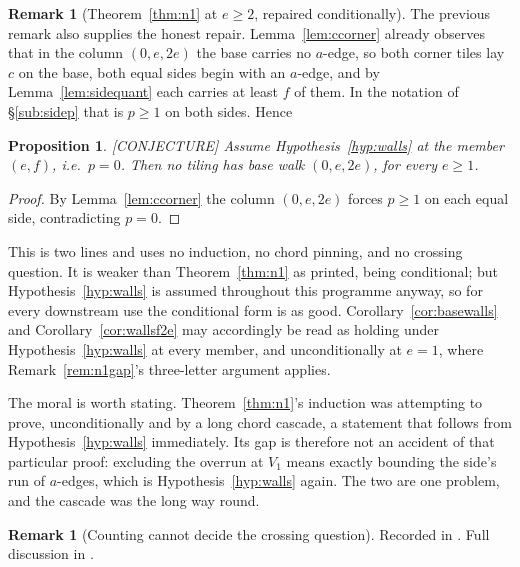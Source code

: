 \documentclass[11pt,reqno]{amsart}
\theoremstyle{plain}
\newtheorem{proposition}[theorem]{Proposition}
\theoremstyle{definition}
\newtheorem{remark}[theorem]{Remark}
\newcommand{\lab}[1]{\hfill\textnormal{\footnotesize\textsc{[#1]}}}
\begin{document}
\begin{remark}[Theorem~\ref{thm:n1} at $e\ge2$, repaired conditionally]\label{rem:n1conditional}
The previous remark also supplies the honest repair. Lemma~\ref{lem:ccorner} already observes that in
the column $(0,e,2e)$ the base carries no $a$-edge, so both corner tiles lay $c$ on the base, both
equal sides begin with an $a$-edge, and by Lemma~\ref{lem:sidequant} each carries at least $f$ of
them. In the notation of \S\ref{sub:sidep} that is $p\ge1$ on both sides. Hence

\begin{proposition}\label{prop:n1fromwalls}\lab{CONJECTURE}
Assume Hypothesis~\ref{hyp:walls} at the member $(e,f)$, i.e.\ $p=0$. Then no tiling has base walk
$(0,e,2e)$, for every $e\ge1$.
\end{proposition}

\begin{proof}
By Lemma~\ref{lem:ccorner} the column $(0,e,2e)$ forces $p\ge1$ on each equal side, contradicting
$p=0$.
\end{proof}

This is two lines and uses no induction, no chord pinning, and no crossing question. It is weaker
than Theorem~\ref{thm:n1} as printed, being conditional; but Hypothesis~\ref{hyp:walls} is assumed
throughout this programme anyway, so for every downstream use the conditional form is as good.
Corollary~\ref{cor:basewalls} and Corollary~\ref{cor:wallsf2e} may accordingly be read as holding
under Hypothesis~\ref{hyp:walls} at every member, and unconditionally at $e=1$, where
Remark~\ref{rem:n1gap}'s three-letter argument applies.

The moral is worth stating. Theorem~\ref{thm:n1}'s induction was attempting to prove, unconditionally
and by a long chord cascade, a statement that follows from Hypothesis~\ref{hyp:walls} immediately.
Its gap is therefore not an accident of that particular proof: excluding the overrun at $V_1$ means
exactly bounding the side's run of $a$-edges, which is Hypothesis~\ref{hyp:walls} again. The two are
one problem, and the cascade was the long way round.
\end{remark}

\begin{remark}[Counting cannot decide the crossing question]\label{rem:censusblind}
Recorded in \cite{Obstructions}. Full discussion in \cite{Obstructions}.
\end{remark}
\end{document}
